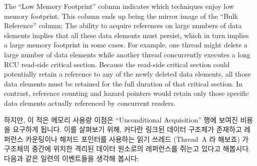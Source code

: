 The ``Low Memory Footprint'' column indicates which techniques enjoy low
memory footprint.
This column ends up being the mirror image of the ``Bulk Reference''
column: The ability to acquire references on large numbers of data
elements implies that all these data elements must persist, which
in turn implies a large memory footprint in some cases.
For example, one thread might delete a large number of data
elements while another thread concurrently executes a long RCU read-side
critical section.
Because the read-side critical section could potentially retain a reference
to any of the newly deleted data elements, all those data elements must
be retained for the full duration of that critical section.
In contrast, reference counting and hazard pointers would retain only
those specific data elements actually referenced by concurrent readers.
\fi

하지만, 이 적은 메모리 사용량 이점은 ``Unconditional Acquisition'' 행에 보여진
비용을 요구하게 됩니다.
이를 살펴보기 위해, 커다란 링크된 데이터 구조체가 존재하고 레퍼런스 카운팅이나
해저드 포인터를 사용하는 읽기 쓰레드 (Thread~A 라 해보죠) 가 구조체의 중간에
위치한 격리된 데이터 원소로의 레퍼런스를 쥐는고 있다고 해봅시다.
다음과 같은 일련의 이벤트들을 생각해 봅시다:
\iffalse

However, this low-memory-footprint advantage comes at a price, as shown
in the ``Unconditional Acquisition'' column.
To see this, imagine a large linked data structure in which a
reference-counting or hazard-pointer reader (call it Thread~A)
holds a reference to
an isolated data element in the middle of that structure.
Consider the following sequence of events:
\fi

